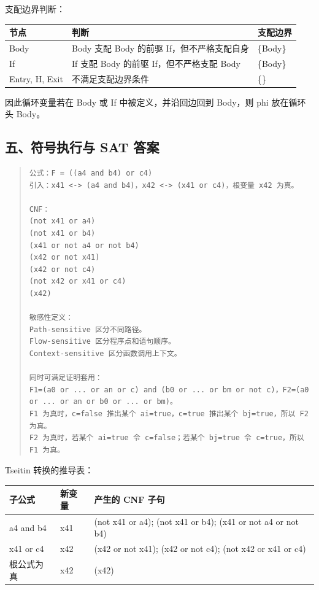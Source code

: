 \documentclass[UTF8,zihao=-4]{ctexart}
\begin{document}
支配边界判断：

\begin{center}
\footnotesize
\begin{tabular}{lll}
\hline
节点 & 判断 & 支配边界 \\
\hline
Body & Body 支配 Body 的前驱 If，但不严格支配自身 & \{Body\} \\
If & If 支配 Body 的前驱 If，但不严格支配 Body & \{Body\} \\
Entry, H, Exit & 不满足支配边界条件 & \{\} \\
\hline
\end{tabular}
\end{center}

因此循环变量若在 Body 或 If 中被定义，并沿回边回到 Body，则 phi 放在循环头 Body。



\subsection{五、符号执行与 SAT 答案}


\begin{quote}
\footnotesize
\begin{verbatim}
公式：F = ((a4 and b4) or c4)
引入：x41 <-> (a4 and b4)，x42 <-> (x41 or c4)，根变量 x42 为真。

CNF：
(not x41 or a4)
(not x41 or b4)
(x41 or not a4 or not b4)
(x42 or not x41)
(x42 or not c4)
(not x42 or x41 or c4)
(x42)

敏感性定义：
Path-sensitive 区分不同路径。
Flow-sensitive 区分程序点和语句顺序。
Context-sensitive 区分函数调用上下文。

同时可满足证明套用：
F1=(a0 or ... or an or c) and (b0 or ... or bm or not c)，F2=(a0 or ... or an or b0 or ... or bm)。
F1 为真时，c=false 推出某个 ai=true，c=true 推出某个 bj=true，所以 F2 为真。
F2 为真时，若某个 ai=true 令 c=false；若某个 bj=true 令 c=true，所以 F1 为真。
\end{verbatim}
\end{quote}

Tseitin 转换的推导表：

\begin{center}
\footnotesize
\begin{tabular}{lll}
\hline
子公式 & 新变量 & 产生的 CNF 子句 \\
\hline
a4 and b4 & x41 & (not x41 or a4); (not x41 or b4); (x41 or not a4 or not b4) \\
x41 or c4 & x42 & (x42 or not x41); (x42 or not c4); (not x42 or x41 or c4) \\
根公式为真 & x42 & (x42) \\
\hline
\end{tabular}
\end{center}
\end{document}
